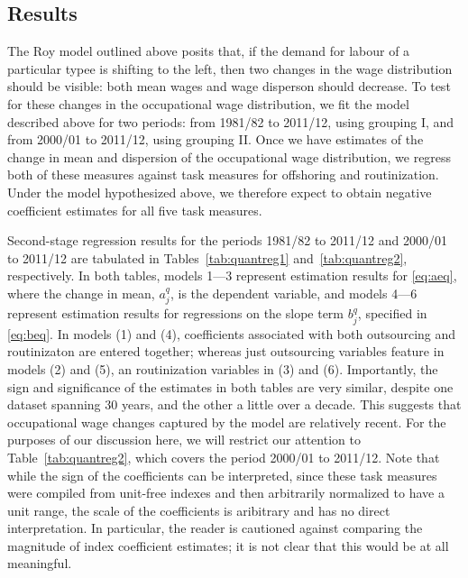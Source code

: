 \subsection{Results}

The Roy model outlined above posits that, if the demand for labour of a particular typee is shifting to the left, then two changes in the wage distribution should be visible: both mean wages and wage disperson should decrease. To test for these changes in the occupational wage distribution, we fit the model described above for two periods: from 1981/82 to 2011/12, using grouping I, and from 2000/01 to 2011/12, using grouping II. Once we have estimates of the change in mean and dispersion of the occupational wage distribution, we regress both of these measures against task measures for offshoring and routinization. Under the model hypothesized above, we therefore expect to obtain negative coefficient estimates for all five task measures.

Second-stage regression results for the periods 1981/82 to 2011/12 and 2000/01 to 2011/12 are tabulated in Tables~\ref{tab:quantreg1} and~\ref{tab:quantreg2}, respectively. In both tables, models 1---3 represent estimation results for \eqref{eq:aeq}, where the change in mean, $a_j^q$, is the dependent variable, and models 4---6 represent estimation results for regressions on the slope term $b_j^q$, specified in \eqref{eq:beq}. In models (1) and (4), coefficients associated with both outsourcing and routinizaton are entered together; whereas just outsourcing variables feature in models (2) and (5), an routinization variables in (3) and (6). Importantly, the sign and significance of the estimates in both tables are very similar, despite one dataset spanning 30 years, and the other a little over a decade. This suggests that occupational wage changes captured by the model are relatively recent. For the purposes of our discussion here, we will restrict our attention to Table~\ref{tab:quantreg2}, which covers the period 2000/01 to 2011/12. Note that while the sign of the coefficients can be interpreted, since these task measures were compiled from unit-free indexes and then arbitrarily normalized to have a unit range, the scale of the coefficients is aribitrary and has no direct interpretation. In particular, the reader is cautioned against comparing the magnitude of index coefficient estimates; it is not clear that this would be at all meaningful.





